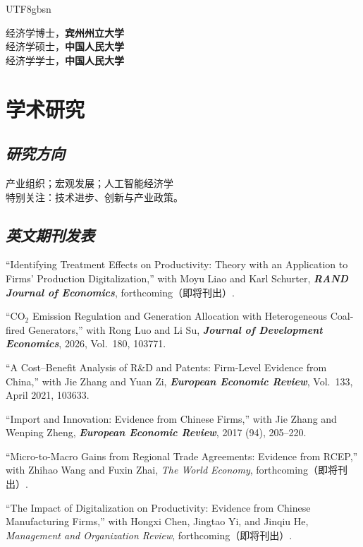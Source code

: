 \documentclass[letterpaper]{article}
\begin{document}
\begin{CJK}{UTF8}{gbsn}
\begin{minipage}{0.2\textwidth}
\end{minipage}
\begin{minipage}{0.8\textwidth}
  \raggedright
 经济学博士，\textbf{宾州州立大学}\\
 经济学硕士，\textbf{中国人民大学}  \\
 经济学学士，\textbf{中国人民大学}
\end{minipage}

\section*{\textsc{学术研究}}
\subsection*{\textit{研究方向}}
 产业组织；宏观发展；人工智能经济学 \\
 特别关注：技术进步、创新与产业政策。

\subsection*{\textit{英文期刊发表}}
\begin{papers}
\item ``Identifying Treatment Effects on Productivity: Theory with an Application to Firms' Production Digitalization,'' with Moyu Liao and Karl Schurter, \textbf{\textit{RAND Journal of Economics}}, forthcoming（即将刊出）.

\item ``CO$_{2}$ Emission Regulation and Generation Allocation with Heterogeneous Coal-fired Generators,'' with Rong Luo and Li Su, \textbf{\textit{Journal of Development Economics}}, 2026, Vol.\ 180, 103771.

\item ``A Cost--Benefit Analysis of R\&D and Patents: Firm-Level Evidence from China,'' with Jie Zhang and Yuan Zi, \textbf{\textit{European Economic Review}}, Vol.\ 133, April 2021, 103633.

\item ``Import and Innovation: Evidence from Chinese Firms,'' with Jie Zhang and Wenping Zheng, \textbf{\textit{European Economic Review}}, 2017 (94), 205--220.

\item ``Micro-to-Macro Gains from Regional Trade Agreements: Evidence from RCEP,'' with Zhihao Wang and Fuxin Zhai, \textit{The World Economy}, forthcoming（即将刊出）.

\item ``The Impact of Digitalization on Productivity: Evidence from Chinese Manufacturing Firms,'' with Hongxi Chen, Jingtao Yi, and Jinqiu He, \textit{Management and Organization Review}, forthcoming（即将刊出）.


\end{papers}
\end{CJK}
\end{document}
